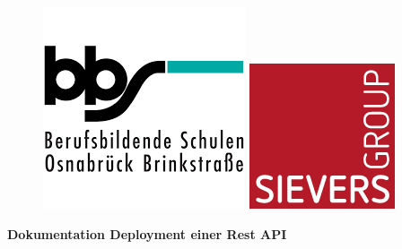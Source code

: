 \documentclass[a4paper, 12pt]{scrartcl}
\begin{document}
\thispagestyle{empty}
\vspace{0.2\textheight}
\begin{center}
    \begin{figure}[H]
        \begin{minipage}{0.3\textwidth}
            \includegraphics[scale=0.6]{Bilder/BBS}
        \end{minipage}
        \hspace{0.48\textwidth}
        \begin{minipage}{0.3\textwidth}
            \includegraphics[scale=0.6]{Bilder/sievers.png}
        \end{minipage}
    \end{figure}
    \vspace{1cm}
    \begin{Huge}
        \textcolor{BBS}{\textbf{Dokumentation Deployment einer Rest API}}
    \end{Huge}
    \\

\end{center}
\end{document}
